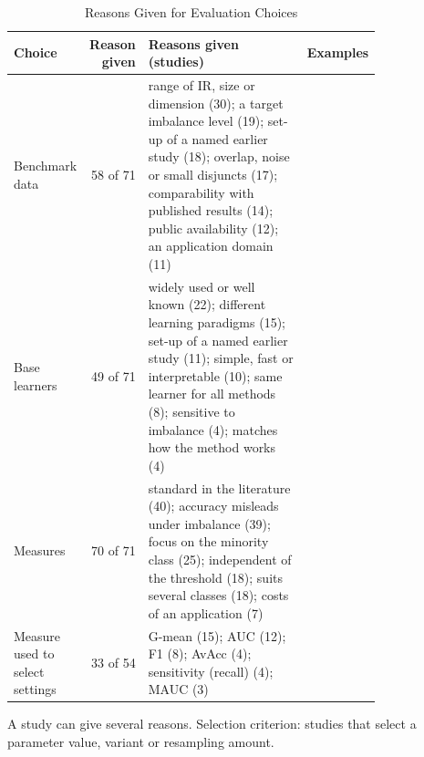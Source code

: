 \begin{table}[t]
  \caption{Reasons Given for Evaluation Choices}
  \label{tab:empirical-reasons}
  \footnotesize
  \setlength{\tabcolsep}{4pt}
  \begin{tabular}{@{}p{0.17\linewidth}rp{0.46\linewidth}p{0.17\linewidth}@{}}
    \toprule
    Choice & Reason given & Reasons given (studies) & Examples\\
    \midrule
    Benchmark data & 58 of 71 & range of IR, size or dimension (30); a target imbalance level (19); set-up of a named earlier study (18); overlap, noise or small disjuncts (17); comparability with published results (14); public availability (12); an application domain (11) & \parencite{barua2014mwmote,saez2015smoteipf,koziarski2020mcccr}\\
    Base learners & 49 of 71 & widely used or well known (22); different learning paradigms (15); set-up of a named earlier study (11); simple, fast or interpretable (10); same learner for all methods (8); sensitive to imbalance (4); matches how the method works (4) & \parencite{napierala2010spider2,liu2023nromm,yan2025gdhs}\\
    Measures & 70 of 71 & standard in the literature (40); accuracy misleads under imbalance (39); focus on the minority class (25); independent of the threshold (18); suits several classes (18); costs of an application (7) & \parencite{kubat1997oss,sun2015splitbal,yadav2025ciso}\\
    Measure used to select settings & 33 of 54 & G-mean (15); AUC (12); F1 (8); AvAcc (4); sensitivity (recall) (4); MAUC (3) & \parencite{kubat1998shrink,cieslak2008ls,das2015racog}\\
    \bottomrule
  \end{tabular}
  \par\smallskip\raggedright\scriptsize A study can give several reasons. Selection criterion: studies that select a parameter value, variant or resampling amount.
\end{table}
